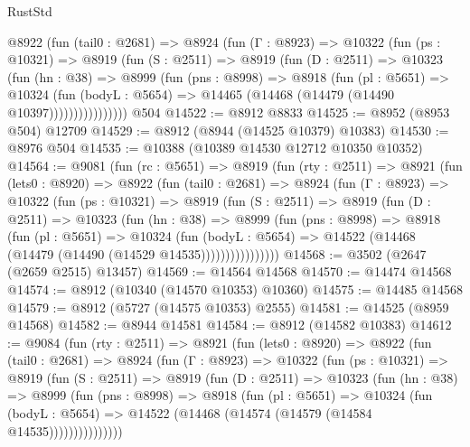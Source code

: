 \begin{lexlean}{RustStd}
\begin{coremodule}
          @8922
            (fun (tail0 : @2681) =>
            @8924
              (fun (Γ : @8923) =>
              @10322
                (fun (ps : @10321) =>
                @8919
                  (fun (S : @2511) =>
                  @8919
                    (fun (D : @2511) =>
                    @10323
                      (fun (hn : @38) =>
                      @8999
                        (fun (pns : @8998) =>
                        @8918
                          (fun (pl : @5651) =>
                          @10324
                            (fun (bodyL : @5654) =>
                            @14465 (@14468 (@14479 (@14490 @10397))))))))))))))))
    @504
@14522 := @8912 @8833
@14525 := @8952 (@8953 @504) @12709
@14529 := @8912 (@8944 (@14525 @10379) @10383)
@14530 := @8976 @504
@14535 := @10388 (@10389 @14530 @12712 @10350 @10352)
@14564 := @9081
    (fun (rc : @5651) =>
    @8919
      (fun (rty : @2511) =>
      @8921
        (fun (lets0 : @8920) =>
        @8922
          (fun (tail0 : @2681) =>
          @8924
            (fun (Γ : @8923) =>
            @10322
              (fun (ps : @10321) =>
              @8919
                (fun (S : @2511) =>
                @8919
                  (fun (D : @2511) =>
                  @10323
                    (fun (hn : @38) =>
                    @8999
                      (fun (pns : @8998) =>
                      @8918
                        (fun (pl : @5651) =>
                        @10324
                          (fun (bodyL : @5654) =>
                          @14522 (@14468 (@14479 (@14490 (@14529 @14535))))))))))))))))
@14568 := @3502 (@2647 (@2659 @2515) @13457)
@14569 := @14564 @14568
@14570 := @14474 @14568
@14574 := @8912 (@10340 (@14570 @10353) @10360)
@14575 := @14485 @14568
@14579 := @8912 (@5727 (@14575 @10353) @2555)
@14581 := @14525 (@8959 @14568)
@14582 := @8944 @14581
@14584 := @8912 (@14582 @10383)
@14612 := @9084
    (fun (rty : @2511) =>
    @8921
      (fun (lets0 : @8920) =>
      @8922
        (fun (tail0 : @2681) =>
        @8924
          (fun (Γ : @8923) =>
          @10322
            (fun (ps : @10321) =>
            @8919
              (fun (S : @2511) =>
              @8919
                (fun (D : @2511) =>
                @10323
                  (fun (hn : @38) =>
                  @8999
                    (fun (pns : @8998) =>
                    @8918
                      (fun (pl : @5651) =>
                      @10324
                        (fun (bodyL : @5654) =>
                        @14522 (@14468 (@14574 (@14579 (@14584 @14535)))))))))))))))

\end{coremodule}
\end{lexlean}
